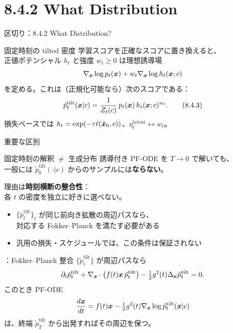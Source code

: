 \section{8.4.2 What Distribution}
\asmain
\begin{frame}{区切り：8.4.2 What Distribution?}
    \tableofcontents[currentsection]
\end{frame}
\asmain
\begin{frame}{固定時刻の tilted 密度}
    学習スコアを正確なスコアに置き換えると、\\
    正値ポテンシャル $h_t$ と強度 $w_t\ge 0$ は理想誘導場
    \[
        \nabla_{\bm{x}}\log p_t(\bm{x})+w_t\nabla_{\bm{x}}\log h_t(\bm{x};c)
    \]
    を定める。これは（正規化可能なら）次のスコアである：
    \[
        \tilde p_t^{\mathrm{tilt}}(\bm{x}|c)
        =
        \frac{1}{Z_t(c)}\,p_t(\bm{x})\,h_t(\bm{x};c)^{w_t}.
        \tag{8.4.3}
    \]
    損失ベースでは $h_t=\exp(-\tau\ell(\hat{\bm{x}}_0,c))$、$\eta_t^{\mathrm{latent}}\leftrightarrow w_t$。
\end{frame}
\asmain
\begin{frame}{重要な区別}
    \begin{alertblock}{固定時刻の解釈 $\neq$ 生成分布}
        誘導付き PF-ODE を $T\to 0$ で解いても、\\
        一般には $\tilde p_0^{\mathrm{tilt}}(\cdot|c)$ からのサンプルには\textbf{ならない}。
    \end{alertblock}
    理由は\textbf{時刻横断の整合性}：\\
    各 $t$ の密度を独立に好きに選べない。
    \begin{itemize}
        \item $\{\tilde p_t^{\mathrm{tilt}}\}_t$ が同じ前向き拡散の周辺パスなら、\\
        対応する Fokker--Planck を満たす必要がある
        \item 汎用の損失・スケジュールでは、この条件は保証されない
    \end{itemize}
\end{frame}
\assuppl
\begin{frame}{\supplmark：Fokker--Planck 整合}
    $\{\tilde p_t^{\mathrm{tilt}}\}$ が周辺パスなら
    \[
        \partial_t\tilde p_t^{\mathrm{tilt}}
        +\nabla_{\bm{x}}\cdot\bigl(f(t)\bm{x}\,\tilde p_t^{\mathrm{tilt}}\bigr)
        -\tfrac12 g^{2}(t)\Delta_{\bm{x}}\tilde p_t^{\mathrm{tilt}}
        =0.
    \]
    このとき PF-ODE
    \[
        \frac{d\bm{x}}{dt}
        =
        f(t)\bm{x}-\tfrac12 g^{2}(t)\nabla_{\bm{x}}\log\tilde p_t^{\mathrm{tilt}}(\bm{x}|c)
    \]
    は、終端 $\tilde p_T^{\mathrm{tilt}}$ から出発すればその周辺を保つ。
\end{frame}
